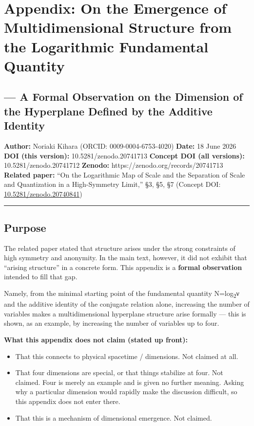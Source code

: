\documentclass[11pt]{ltjsarticle}
\providecommand{\tightlist}{\setlength{\itemsep}{0pt}\setlength{\parskip}{0pt}}
\begin{document}
\section{Appendix: On the Emergence of Multidimensional Structure from
the Logarithmic Fundamental
Quantity}\label{appendix-on-the-emergence-of-multidimensional-structure-from-the-logarithmic-fundamental-quantity}

\subsection{--- A Formal Observation on the Dimension of the Hyperplane
Defined by the Additive
Identity}\label{a-formal-observation-on-the-dimension-of-the-hyperplane-defined-by-the-additive-identity}

\textbf{Author:} Noriaki Kihara (ORCID: 0009-0004-6753-4020)
\textbf{Date:} 18 June 2026 \textbf{DOI (this version):}
10.5281/zenodo.20741713 \textbf{Concept DOI (all versions):}
10.5281/zenodo.20741712 \textbf{Zenodo:}
https://zenodo.org/records/20741713 \textbf{Related paper:} ``On the
Logarithmic Map of Scale and the Separation of Scale and Quantization in
a High-Symmetry Limit,'' §3, §5, §7 (Concept DOI:
\href{https://doi.org/10.5281/zenodo.20740841}{10.5281/zenodo.20740841})

\begin{center}\rule{0.5\linewidth}{0.5pt}\end{center}

\subsection{Purpose}\label{purpose}

The related paper stated that structure arises under the strong
constraints of high symmetry and anonymity. In the main text, however,
it did not exhibit that ``arising structure'' in a concrete form. This
appendix is a \textbf{formal observation} intended to fill that gap.

Namely, from the minimal starting point of the fundamental quantity
N=log\textsubscript{2}ν and the additive identity of the conjugate relation alone,
increasing the number of variables makes a multidimensional hyperplane
structure arise formally --- this is shown, as an example, by increasing
the number of variables up to four.

\textbf{What this appendix does not claim (stated up front):}

\begin{itemize}
\tightlist
\item
  That this connects to physical spacetime / dimensions. Not claimed at
  all.
\item
  That four dimensions are special, or that things stabilize at four.
  Not claimed. Four is merely an example and is given no further
  meaning. Asking why a particular dimension would rapidly make the
  discussion difficult, so this appendix does not enter there.
\item
  That this is a mechanism of dimensional emergence. Not claimed.
\end{itemize}
\end{document}
